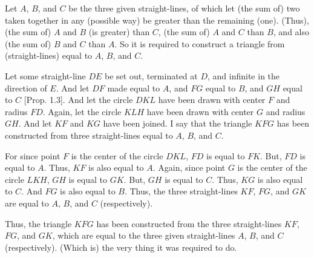 \begin{Parallel}{}{}
{\epsfysize=2.3in
\centerline{}

Let $A$, $B$, and $C$ be the three given straight-lines, of which let (the sum of) two taken together in any (possible way)
be greater than the remaining (one). (Thus), (the sum of) $A$ and $B$ (is greater) than $C$, (the sum of) $A$ and $C$ than $B$,
and also (the sum of) $B$ and $C$ than $A$. So it is required to construct a triangle
from (straight-lines) equal to $A$, $B$, and $C$.

Let some straight-line $DE$ be set out, terminated at $D$, and infinite in the
direction of $E$.  And let $DF$ made equal to $A$, and $FG$
equal to $B$, and $GH$ equal to $C$ [Prop. 1.3]. And let the
circle $DKL$ have been drawn with center $F$ and radius $FD$. Again,
let the circle $KLH$ have been drawn with center $G$ and radius $GH$. And
let $KF$ and $KG$ have been joined. I say that the triangle $KFG$ has been
constructed from three straight-lines equal to $A$, $B$, and $C$.

For since point $F$ is the center of the circle $DKL$, $FD$ is equal to $FK$.
But, $FD$ is equal to $A$. Thus, $KF$ is also equal to $A$. Again, since point
$G$ is the center of the circle $LKH$, $GH$ is equal to $GK$. But, $GH$ is equal
to $C$. Thus, $KG$ is also equal to $C$. And $FG$ is also equal to $B$. Thus,
the three straight-lines $KF$, $FG$, and $GK$ are equal to $A$, $B$, and $C$ (respectively).

Thus, the triangle $KFG$ has been constructed from the three straight-lines
$KF$, $FG$, and $GK$, which are equal to the three given straight-lines
$A$, $B$, and $C$ (respectively). (Which is) the very thing it was required
to do.}
\end{Parallel}

